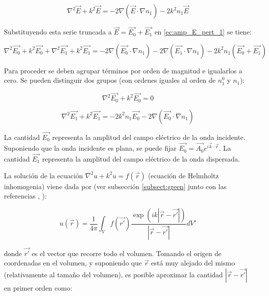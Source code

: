 \begin{equation}\label{ec:amp_E_pert_1}
     \nabla^2 \vec{E} + k^2 \vec{E}= - 2\nabla(\vec{E} \cdot \nabla n_1) - 2k^2n_1 \vec{E}
\end{equation}

Substituyendo esta serie truncada a $\vec{E} = \vec{E_0} + \vec{E_1}$ en \ref{ec:amp_E_pert_1} se tiene:

\begin{equation}
    \nabla^2 \vec{E_0} + k^2 \vec{E_0} + \nabla^2 \vec{E_1} + k^2 \vec{E_1} = - 2\nabla(\vec{E_0} \cdot \nabla n_1) - 2\nabla(\vec{E_1} \cdot \nabla n_1) - 2k^2n_1 (\vec{E_0} + \vec{E_1})
\end{equation}

Para proceder se deben agrupar términos por orden de magnitud e igualarlos a cero. Se pueden distinguir dos grupos (con ordenes iguales al orden de $n_1^0$ y $n_1$):

\begin{equation}
    \nabla^2 \vec{E_0} + k^2 \vec{E_0} = 0
\end{equation}

\begin{equation}\label{ec:amp_E_pert_grupo2}
    \nabla^2 \vec{E_1} + k^2 \vec{E_1} = - 2k^2n_1\vec{E_0} - 2\nabla(\vec{E_0} \cdot \nabla n_1)
\end{equation}

La cantidad $\vec{E_0}$ representa la amplitud del campo eléctrico de la onda incidente. Suponiendo que la onda incidente es plana, se puede fijar $\vec{E_0}= \vec{A_0}e^{i\vec{k}\cdot\vec{r}}$. La cantidad $\vec{E_1}$ representa la amplitud del campo eléctrico de la onda dispersada. 

La solución de la ecuación $\nabla^2u + k^2 u = f(\vec{r})$ (ecuación de Helmholtz inhomogenia) viene dada por (ver subsección \ref{subsect:green} junto con las referencias \cite{jackson_classical_1975}, \cite{morse_methods_1999}):

\begin{equation}\label{ec:solucion_hemholz_inhomogenia}
    u(\vec{r}) = \frac{1}{4\pi} \int_V f(\vec{r'}) \frac{\exp(ik |\vec{r}- \vec{r'}|)}{|\vec{r}- \vec{r'}|}dV'
\end{equation}

donde $\vec{r'}$ es el vector que recorre todo el volumen. Tomando el origen de coordenadas en el volumen, y suponiendo que $\vec{r}$ está muy alejado del mismo (relativamente al tamaño del volumen), es posible aproximar la cantidad $|\vec{r}- \vec{r'}|$ en primer orden como:

